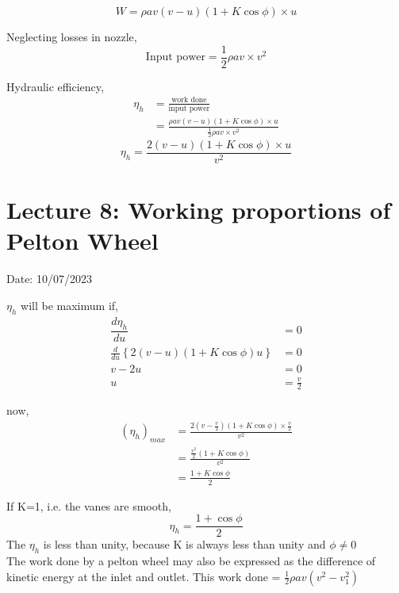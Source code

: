 \documentclass{article}
\begin{document}
\begin{equation}
  W = \rho a v (v - u)(1 + K  \cos \phi)  \times u \label{eq:eq34}
\end{equation}

Neglecting losses in nozzle,\\
 \begin{equation}
 \text{Input power} = \frac{1}{2} \rho a v \times v^2 \label{eq:eq35}
\end{equation}

Hydraulic efficiency,
\begin{align*}
  \eta_h &= \frac{\text{work done}}{\text{input power}} \\ 
  &= \frac{\rho a v (v - u)(1 + K  \cos \phi)  \times u}{\frac{1}{2} \rho a v \times v^2}
\end{align*}
\begin{equation}
  \eta_h = \frac{ 2 (v - u)(1 + K  \cos \phi)  \times u}{v^2} \label{eq:eq36}
 \end{equation}

 \vspace*{1cm}

 \section{Lecture 8: Working proportions of Pelton Wheel}
\hfill Date: 10/07/2023

$\eta_h$ will be maximum if, 
\begin{align*}
  \dfrac{d\eta_h}{du} &= 0 \\
  \frac{d}{du} \left\{2 (v-u) (1 + K \cos \phi) u \right\} &= 0 \\
  v - 2u &= 0 \\
  u &= \frac{v}{2}
\end{align*}

now, 
\begin{align*}
  (\eta_h)_{max} &= \frac{ 2 (v - \frac{v}{2})(1 + K  \cos \phi)  \times \frac{v}{2}}{v^2} \\
  &= \frac{ \frac{v^2}{2}(1 + K  \cos \phi)}{v^2} \\
  &= \frac{1 + K  \cos \phi}{2}
\end{align*}

If K=1, i.e. the vanes are smooth,
$$\eta_h = \frac{1 + \cos \phi}{2}$$
The $\eta_h$ is less than unity, because K is always less than unity and $\phi \neq  0$
\\

The work done by a pelton wheel may also be expressed as the difference of kinetic energy at the inlet and outlet. This work done = $\frac{1}{2} \rho a v \left(v^2 - v_1^2\right)$
\end{document}
